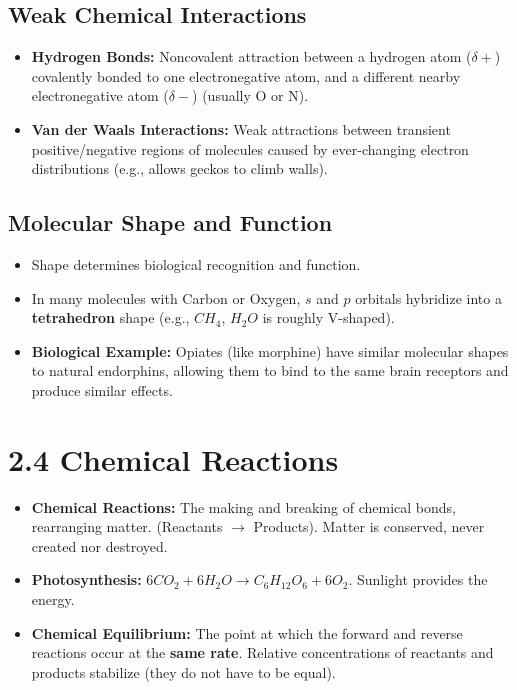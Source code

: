 \documentclass[11pt, a4paper]{article}
\begin{document}
\subsection*{Weak Chemical Interactions}
\begin{itemize}
    \item \textbf{Hydrogen Bonds:} Noncovalent attraction between a hydrogen atom ($\delta+$) covalently bonded to one electronegative atom, and a different nearby electronegative atom ($\delta-$) (usually O or N).
    \item \textbf{Van der Waals Interactions:} Weak attractions between transient positive/negative regions of molecules caused by ever-changing electron distributions (e.g., allows geckos to climb walls).
\end{itemize}

\subsection*{Molecular Shape and Function}
\begin{itemize}
    \item Shape determines biological recognition and function. 
    \item In many molecules with Carbon or Oxygen, $s$ and $p$ orbitals hybridize into a \textbf{tetrahedron} shape (e.g., $CH_4$, $H_2O$ is roughly V-shaped).
    \item \textbf{Biological Example:} Opiates (like morphine) have similar molecular shapes to natural endorphins, allowing them to bind to the same brain receptors and produce similar effects.
\end{itemize}

\section*{2.4 Chemical Reactions}
\begin{itemize}
    \item \textbf{Chemical Reactions:} The making and breaking of chemical bonds, rearranging matter. (Reactants $\rightarrow$ Products). Matter is conserved, never created nor destroyed.
    \item \textbf{Photosynthesis:} $6CO_2 + 6H_2O \rightarrow C_6H_{12}O_6 + 6O_2$. Sunlight provides the energy.
    \item \textbf{Chemical Equilibrium:} The point at which the forward and reverse reactions occur at the \textbf{same rate}. Relative concentrations of reactants and products stabilize (they do not have to be equal).
\end{itemize}
\end{document}

